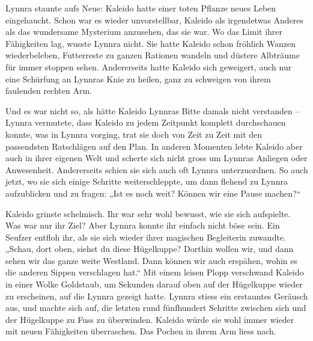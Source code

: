 \documentclass[10pt, a4paper, oneside]{book}
\begin{document}
Lynnra staunte aufs Neue: Kaleido hatte einer toten Pflanze neues Leben eingehaucht. Schon war es wieder unvorstellbar, Kaleido als irgendetwas Anderes als das wundersame Mysterium anzusehen, das sie war. Wo das Limit ihrer Fähigkeiten lag, wusste Lynnra nicht. Sie hatte Kaleido schon fröhlich Wanzen wiederbeleben, Futterreste zu ganzen Rationen wandeln und düstere Albträume für immer stoppen sehen. Andererseits hatte Kaleido sich geweigert, auch nur eine Schürfung an Lynnras Knie zu heilen, ganz zu schweigen von ihrem faulenden rechten Arm.



Und es war nicht so, als hätte Kaleido Lynnras Bitte damals nicht verstanden – Lynnra vermutete, dass Kaleido zu jedem Zeitpunkt komplett durchschauen konnte, was in Lynnra vorging, trat sie doch von Zeit zu Zeit mit den passendsten Ratschlägen auf den Plan. In anderen Momenten lebte Kaleido aber auch in ihrer eigenen Welt und scherte sich nicht gross um Lynnras Anliegen oder Anwesenheit. Andererseits schien sie sich auch oft Lynnra unterzuordnen. So auch jetzt, wo sie sich einige Schritte weiterschleppte, um dann flehend zu Lynnra aufzublicken und zu fragen: „Ist es noch weit? Können wir eine Pause machen?“



Kaleido grinste schelmisch. Ihr war sehr wohl bewusst, wie sie sich aufspielte. Was war nur ihr Ziel? Aber Lynnra konnte ihr einfach nicht böse sein. Ein Seufzer entfloh ihr, als sie sich wieder ihrer magischen Begleiterin zuwandte. „Schau, dort oben, siehst du diese Hügelkuppe? Dorthin wollen wir, und dann sehen wir das ganze weite Westland. Dann können wir auch erspähen, wohin es die anderen Sippen verschlagen hat.“ Mit einem leisen Plopp verschwand Kaleido in einer Wolke Goldstaub, um Sekunden darauf oben auf der Hügelkuppe wieder zu erscheinen, auf die Lynnra gezeigt hatte. Lynnra stiess ein erstauntes Geräusch aus, und machte sich auf, die letzten rund fünfhundert Schritte zwischen sich und der Hügelkuppe zu Fuss zu überwinden. Kaleido würde sie wohl immer wieder mit neuen Fähigkeiten überraschen. Das Pochen in ihrem Arm liess nach.
\end{document}
